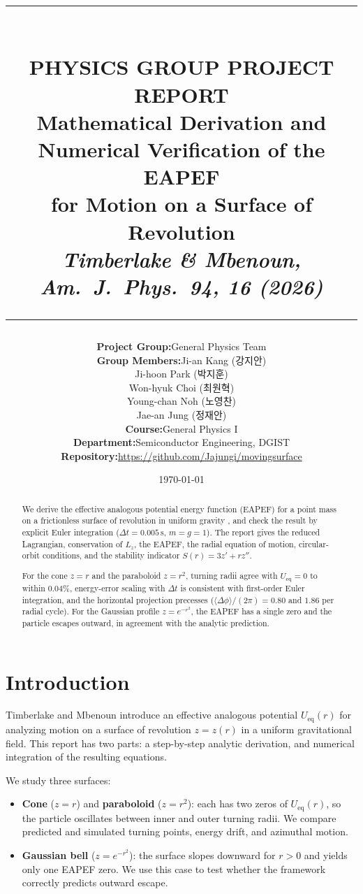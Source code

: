 \documentclass[11pt,letterpaper]{article}
\title{
    \vspace{-1.5in}
    \rule{\linewidth}{1.5pt} \\ \vspace{4mm}
    \large\textbf{PHYSICS GROUP PROJECT REPORT} \\ \vspace{2mm}
    \Large\textbf{Mathematical Derivation and Numerical Verification of the EAPEF \\ for Motion on a Surface of Revolution} \\ \vspace{2mm}
    \large\textit{Timberlake \& Mbenoun, Am.\ J.\ Phys.\ \textbf{94}, 16 (2026)} \\
    \rule{\linewidth}{1.5pt}
}
\author{
    \begin{tabular}{r @{\quad} l}
        \textbf{Project Group:} & General Physics Team \\[1ex]
        \textbf{Group Members:} & \hspace{1.5em}Ji-an Kang (강지안) \\[0.4ex]
                                & \hspace{1.5em}Ji-hoon Park (박지훈) \\[0.4ex]
                                & \hspace{1.5em}Won-hyuk Choi (최원혁) \\[0.4ex]
                                & \hspace{1.5em}Young-chan Noh (노영찬) \\[0.4ex]
                                & \hspace{1.5em}Jae-an Jung (정재안) \\[1ex]
        \textbf{Course:} & General Physics I \\
        \textbf{Department:} & Semiconductor Engineering, DGIST \\[1ex]
        \textbf{Repository:} & \url{https://github.com/Jajungi/movingsurface}
    \end{tabular}
}
\date{\today}
\begin{document}
\maketitle

\begin{abstract}
We derive the effective analogous potential energy function (EAPEF) for a point mass on a frictionless surface of revolution in uniform gravity \cite{ajp2026}, and check the result by explicit Euler integration ($\Delta t=0.005\,\mathrm{s}$, $m=g=1$). The report gives the reduced Lagrangian, conservation of $L_z$, the EAPEF, the radial equation of motion, circular-orbit conditions, and the stability indicator $S(r)=3z'+rz''$.

For the cone $z=r$ and the paraboloid $z=r^2$, turning radii agree with $U_{\mathrm{eq}}=0$ to within $0.04\%$, energy-error scaling with $\Delta t$ is consistent with first-order Euler integration, and the horizontal projection precesses ($\langle\Delta\phi\rangle/(2\pi)=0.80$ and $1.86$ per radial cycle). For the Gaussian profile $z=e^{-r^2}$, the EAPEF has a single zero and the particle escapes outward, in agreement with the analytic prediction.
\end{abstract}

\setcounter{tocdepth}{2}
\tableofcontents
\newpage

\section{Introduction}

Timberlake and Mbenoun \cite{ajp2026} introduce an effective analogous potential $U_{\mathrm{eq}}(r)$ for analyzing motion on a surface of revolution $z=z(r)$ in a uniform gravitational field. This report has two parts: a step-by-step analytic derivation, and numerical integration of the resulting equations.

We study three surfaces:
\begin{itemize}[leftmargin=1.6em, itemsep=0.35em, topsep=0.4em]
    \item \textbf{Cone} ($z=r$) and \textbf{paraboloid} ($z=r^2$): each has two zeros of $U_{\mathrm{eq}}(r)$, so the particle oscillates between inner and outer turning radii. We compare predicted and simulated turning points, energy drift, and azimuthal motion.
    \item \textbf{Gaussian bell} ($z=e^{-r^2}$): the surface slopes downward for $r>0$ and yields only one EAPEF zero. We use this case to test whether the framework correctly predicts outward escape.
\end{itemize}
\end{document}
